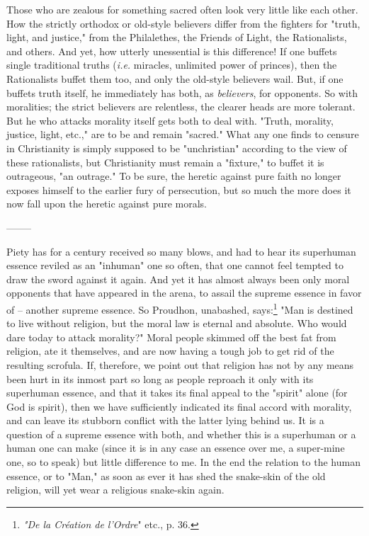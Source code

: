 \documentclass[a4paper]{book}
\begin{document}
Those who are zealous for something sacred often look very little like each 
other. How the strictly orthodox or old-style believers differ from the 
fighters for "{}truth, light, and justice,"{} from the Philalethes, the 
Friends of Light, the Rationalists, and others. And yet, how utterly 
unessential is this difference! If one buffets single traditional truths 
(\textit{i.e.} miracles, unlimited power of princes), then the Rationalists 
buffet them too, and only the old-style believers wail. But, if one buffets 
truth itself, he immediately has both, as \textit{believers}, for opponents. 
So with moralities; the strict believers are relentless, the clearer heads are 
more tolerant. But he who attacks morality itself gets both to deal with. 
"{}Truth, morality, justice, light, etc.,"{} are to be and remain 
"{}sacred."{} What any one finds to censure in Christianity is simply supposed 
to be "{}unchristian"{} according to the view of these rationalists, but 
Christianity must remain a "{}fixture,"{} to buffet it is outrageous, "{}an 
outrage."{} To be sure, the heretic against pure faith no longer exposes 
himself to the earlier fury of persecution, but so much the more does it now 
fall upon the heretic against pure morals.

\begin{center}
--------\end{center}


Piety has for a century received so many blows, and had to hear its superhuman 
essence reviled as an "{}inhuman"{} one so often, that one cannot feel tempted 
to draw the sword against it again. And yet it has almost always been only 
moral opponents that have appeared in the arena, to assail the supreme essence 
in favor of -- another supreme essence. So Proudhon, unabashed, 
says:\footnote{\textit{"{}De la Cr\'eation de l'Ordre}"{} etc., p. 36.} "{}Man 
is destined to live without religion, but the moral law is eternal and 
absolute. Who would dare today to attack morality?"{} Moral people skimmed off 
the best fat from religion, ate it themselves, and are now having a tough job 
to get rid of the resulting scrofula. If, therefore, we point out that 
religion has not by any means been hurt in its inmost part so long as people 
reproach it only with its superhuman essence, and that it takes its final 
appeal to the "{}spirit"{} alone (for God is spirit), then we have 
sufficiently indicated its final accord with morality, and can leave its 
stubborn conflict with the latter lying behind us. It is a question of a 
supreme essence with both, and whether this is a superhuman or a human one can 
make (since it is in any case an essence over me, a super-mine one, so to 
speak) but little difference to me. In the end the relation to the human 
essence, or to "{}Man,"{} as soon as ever it has shed the snake-skin of the 
old religion, will yet wear a religious snake-skin again.
\end{document}
